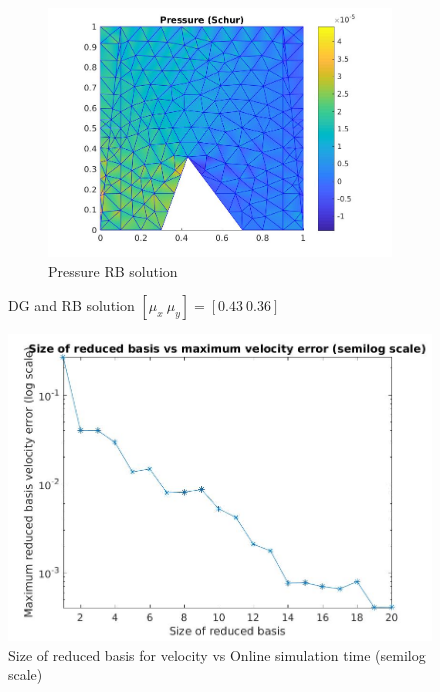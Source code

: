 \documentclass[graybox]{svmult}
\begin{document}
\begin{figure}
\begin{subfigure}{0.31\textwidth}
\includegraphics[width=\linewidth]{offline_pressure_at_43_36.jpg}
\caption{Pressure RB solution} \label{pre_rb}
\end{subfigure}
\caption{DG and RB solution $[\mu_x \ \mu_y] = [0.43 \ 0.36]$} 
\label{dg_rb_solution_43_36}
\end{figure}

\begin{figure}
  \includegraphics[width=\linewidth]{size_vs_maximum_reduced_basis_velocity_error_semilog.jpg}
  \caption{Size of reduced basis for velocity vs Online simulation time (semilog scale)} 
\label{online_simulation_time}
\end{figure}
\end{document}
